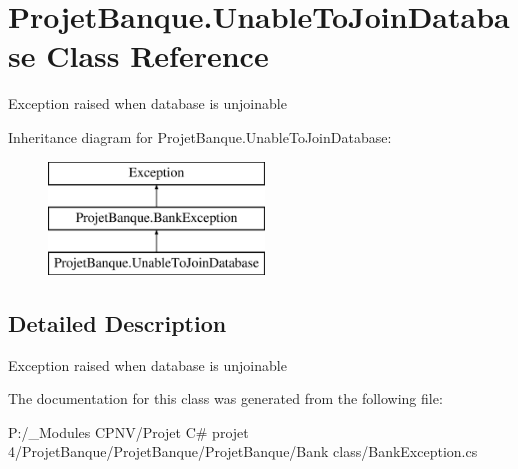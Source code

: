 \hypertarget{class_projet_banque_1_1_unable_to_join_database}{}\section{Projet\+Banque.\+Unable\+To\+Join\+Database Class Reference}
\label{class_projet_banque_1_1_unable_to_join_database}


Exception raised when database is unjoinable  


Inheritance diagram for Projet\+Banque.\+Unable\+To\+Join\+Database\+:\begin{figure}[H]
\begin{center}
\leavevmode
\includegraphics[height=3.000000cm]{class_projet_banque_1_1_unable_to_join_database}
\end{center}
\end{figure}


\subsection{Detailed Description}
Exception raised when database is unjoinable 



The documentation for this class was generated from the following file\+:\begin{DoxyCompactItemize}
\item 
P\+:/\+\_\+\+Modules C\+P\+N\+V/\+Projet C\# projet 4/\+Projet\+Banque/\+Projet\+Banque/\+Projet\+Banque/\+Bank class/Bank\+Exception.\+cs\end{DoxyCompactItemize}
